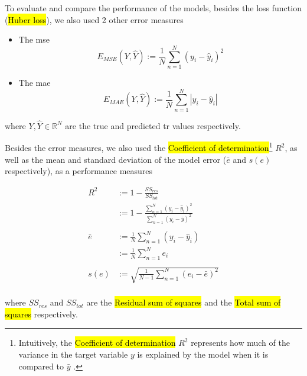 
\glsresetall
\graphicspath{{./Sections/Methodology/Resources/}}

To evaluate and compare the performance of the models, besides the loss function (\hl{Huber loss}), we also used 2 other error measures

\begin{itemize}
  \item The \acrfull{mse}
    \begin{equation}
      E_{MSE}(Y,\hat{Y}) := \frac{1}{N} \sum_{n=1}^N (y_i-\hat{y}_i)^2
    \end{equation}
  \item The \acrfull{mae}
    \begin{equation}
      E_{MAE}(Y,\hat{Y}) := \frac{1}{N} \sum_{n=1}^N |y_i-\hat{y}_i|
    \end{equation}
\end{itemize}

\noindent where $Y, \hat{Y} \in \mathbb{R}^N$ are the true and predicted \gls{tr} values respectively.

Besides the error measures, we also used the \hl{Coefficient of determination}\footnote{Intuitively, the \hl{Coefficient of determination} $R^2$ represents how much of the variance in the target variable $y$ is explained by the model when it is compared to $\bar{y}$ \cite{steel1960principles}.} $R^2$, as well as the mean and standard deviation of the model error ($\bar{e}$ and $s(e)$ respectively), as a performance measures

\begin{equation}
  \begin{split}
    R^2 &:= 1 - \frac{SS_{res}}{SS_{tot}} \\
    &:= 1- \frac{\sum_{n=1}^N (y_i-\hat{y}_i)^2}{\sum_{n=1}^N (y_i-\bar{y})^2} \\
    \\
    \bar{e} &:= \frac{1}{N} \sum_{n=1}^N (y_i-\hat{y}_i) \\
    &:= \frac{1}{N} \sum_{n=1}^N e_i \\
    \\
    s(e) &:= \sqrt{\frac{1}{N-1} \sum_{n=1}^N (e_i-\bar{e})^2} \\
  \end{split}
\end{equation}

\noindent where $SS_{res}$ and $SS_{tot}$ are the \hl{Residual sum of squares} and the \hl{Total sum of squares} respectively.
